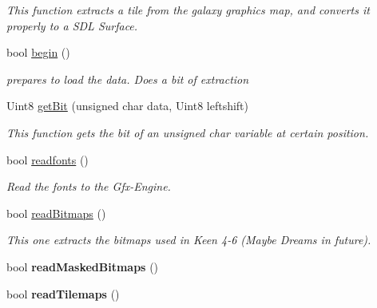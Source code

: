 \begin{DoxyCompactItemize}
\begin{DoxyCompactList}\small\item\em This function extracts a tile from the galaxy graphics map, and converts it properly to a SDL Surface. \item\end{DoxyCompactList}\item 
bool \hyperlink{classgalaxy_1_1_c_e_g_a_graphics_galaxy_a11844830e253d16d1cee988786314f9b}{begin} ()
\begin{DoxyCompactList}\small\item\em prepares to load the data. Does a bit of extraction \item\end{DoxyCompactList}\item 
Uint8 \hyperlink{classgalaxy_1_1_c_e_g_a_graphics_galaxy_a1f7e385c838fc18ab44d9fb4e2897892}{getBit} (unsigned char data, Uint8 leftshift)
\begin{DoxyCompactList}\small\item\em This function gets the bit of an unsigned char variable at certain position. \item\end{DoxyCompactList}\item 
bool \hyperlink{classgalaxy_1_1_c_e_g_a_graphics_galaxy_a059bab49e5e4999f959a407084efe023}{readfonts} ()
\begin{DoxyCompactList}\small\item\em Read the fonts to the Gfx-\/Engine. \item\end{DoxyCompactList}\item 
bool \hyperlink{classgalaxy_1_1_c_e_g_a_graphics_galaxy_abbc3e13228b0c108739ce838e2be4385}{readBitmaps} ()
\begin{DoxyCompactList}\small\item\em This one extracts the bitmaps used in Keen 4-\/6 (Maybe Dreams in future). \item\end{DoxyCompactList}\item 
\hypertarget{classgalaxy_1_1_c_e_g_a_graphics_galaxy_ae85cb4454c18fd220e343db31a8c4bce}{
bool {\bfseries readMaskedBitmaps} ()}
\label{classgalaxy_1_1_c_e_g_a_graphics_galaxy_ae85cb4454c18fd220e343db31a8c4bce}

\item 
\hypertarget{classgalaxy_1_1_c_e_g_a_graphics_galaxy_a56903485696f2c0da4192a09f781926e}{
bool {\bfseries readTilemaps} ()}
\label{classgalaxy_1_1_c_e_g_a_graphics_galaxy_a56903485696f2c0da4192a09f781926e}

\end{DoxyCompactItemize}


